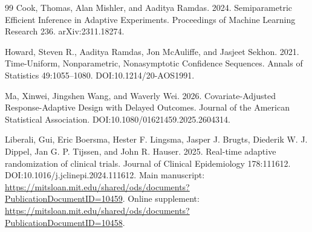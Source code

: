 \documentclass{article}
\begin{document}
\begin{thebibliography}{99}
   Cook, Thomas, Alan Mishler, and Aaditya Ramdas. 2024. Semiparametric Efficient Inference in Adaptive Experiments. Proceedings of Machine Learning Research 236. arXiv:2311.18274.

   Howard, Steven R., Aaditya Ramdas, Jon McAuliffe, and Jasjeet Sekhon. 2021. Time-Uniform, Nonparametric, Nonasymptotic Confidence Sequences. Annals of Statistics 49:1055--1080. DOI:10.1214/20-AOS1991.

   Ma, Xinwei, Jingshen Wang, and Waverly Wei. 2026. Covariate-Adjusted Response-Adaptive Design with Delayed Outcomes. Journal of the American Statistical Association. DOI:10.1080/01621459.2025.2604314.

   Liberali, Gui, Eric Boersma, Hester F. Lingsma, Jasper J. Brugts, Diederik W. J. Dippel, Jan G. P. Tijssen, and John R. Hauser. 2025. Real-time adaptive randomization of clinical trials. Journal of Clinical Epidemiology 178:111612. DOI:10.1016/j.jclinepi.2024.111612. Main manuscript: \url{https://mitsloan.mit.edu/shared/ods/documents?PublicationDocumentID=10459}. Online supplement: \url{https://mitsloan.mit.edu/shared/ods/documents?PublicationDocumentID=10458}.

\end{thebibliography}
\end{document}
